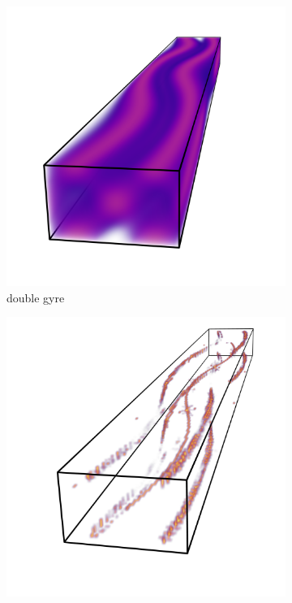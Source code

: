 \begin{figure}
    \begin{subfigure}{0.33\textwidth}
        \includegraphics[trim=200 0 350 0, clip=true, width=\textwidth]{Images/dgyre.png}
        \caption{double gyre}
    \end{subfigure}
    \begin{subfigure}{0.33\textwidth}
        \includegraphics[trim=200 0 200 0, clip=true, width=\textwidth]{Images/RL3D.png}

\end{subfigure}
\end{figure}
